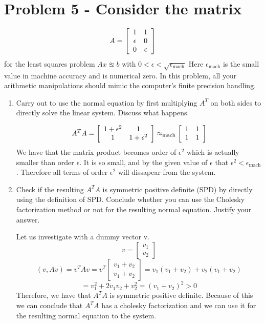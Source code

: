 \documentclass{article}
\begin{document}
\section{Problem 5 - Consider the matrix}

\[
    A = \left[\begin{array}{c c}
                1 & 1 \\ \epsilon & 0 \\ 0 & \epsilon \end{array}\right]
\]
for the least squares problem $Ax \approxeq b$ with $0 < \epsilon < \sqrt{\epsilon_{\text{mach}}}$ Here $\epsilon_{\text{mach}}$ is the small value in
machine accuracy and is numerical zero. In this problem, all your arithmetic manipulations should mimic the computer’s finite precision handling.

\begin{enumerate}
\item Carry out to use the normal equation by first multiplying $A^T$ on both sides to directly solve the linear system. Discuss what happens.

\[
    A^TA = \left[\begin{array}{c c} 1+\epsilon^2 & 1 \\ 1 & 1 + \epsilon^2\end{array}\right] \approx_{\text{mach}} \left[\begin{array}{c c} 1 & 1 \\ 1 & 1\end{array}\right]
\] 
We have that the matrix product becomes order of $\epsilon^2$ which is actually smaller than order $\epsilon$. It is so small, and by the given value of $\epsilon$ that $\epsilon^2 < \epsilon_{\text{mach}}$. Therefore all terms of order $\epsilon^2$ will dissapear from the system. 

\item  Check if the resulting $A^TA$ is symmetric positive definite (SPD) by directly using the definition of SPD. Conclude whether you can use the Cholesky factorization method or not for the resulting normal equation. Justify your answer.

Let us investigate with a dummy vector v. 
\[
    v = \left[\begin{array}{c}v_1 \\ v_2\end{array}\right]
\]
\[
    (v, Av) = v^T Av = v^T \left[\begin{array}{c}v_1 + v_2 \\ v_1 + v_2\end{array}\right] = v_1(v_1 + v_2) + v_2(v_1+v_2)
\]
\[
    = v_1^2 + 2v_1v_2 + v_2^2 = (v_1 + v_2)^2 > 0 
\]
Therefore, we have that $A^TA$ is symmetric positive definite. Because of this we can conclude that $A^TA$ has a cholesky factorization and we can use it for the resulting normal equation to the system. 


\end{enumerate}
\end{document}

